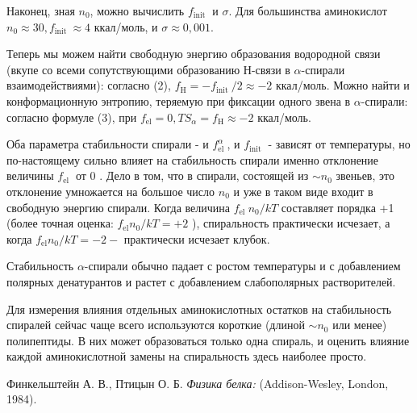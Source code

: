 \documentclass[
11pt,%
tightenlines,%
twoside,%
onecolumn,%
nofloats,%
nobibnotes,%
nofootinbib,%
superscriptaddress,%
noshowpacs,%
centertags]%
{revtex4}
\begin{document}
Наконец, зная $n_0$, можно вычислить $f_{\text {init }}$ и $\sigma$. Для большинства аминокислот $n_0 \approx 30, f_{\text {init }} \approx 4$ ккал/моль, и $\sigma \approx 0,001$.

Теперь мы можем найти свободную энергию образования водородной связи (вкупе со всеми сопутствующими образованию Н-связи в $\alpha$-спирали взаимодействиями): согласно (2), $f_{\mathrm{H}}=-f_{\text {init }} / 2 \approx-2$ ккал/моль. Можно найти и конформационную энтропию, теряемую при фиксации одного звена в $\alpha$-спирали: согласно формуле (3), при $f_{\mathrm{el}}=0, T S_\alpha=f_{\mathrm{H}} \approx-2$ ккал/моль.

Оба параметра стабильности спирали - и $f_{\text {el }}^\alpha$, и $f_{\text {init }}$ - зависят от температуры, но по-настоящему сильно влияет на стабильность спирали именно отклонение величины $f_{\text {el }}$ от 0 . Дело в том, что в спирали, состоящей из $\sim n_0$ звеньев, это отклонение умножается на большое число $n_0$ и уже в таком виде входит в свободную энергию спирали. Когда величина $f_{\text {el }} n_0 / k T$ составляет порядка +1 (более точная оценка: $f_{\mathrm{el}} n_0 / k T=+2$ ), спиральность практически исчезает, а когда $f_{\mathrm{el}} n_0 / k T=-2-$ практически исчезает клубок. 

Стабильность $\alpha$-спирали обычно падает с ростом температуры и с добавлением полярных денатурантов и растет с добавлением слабополярных растворителей.

Для измерения влияния отдельных аминокислотных остатков на стабильность спиралей сейчас чаще всего используются короткие (длиной $\sim n_0$ или менее) полипептиды. В них может образоваться только одна спираль, и оценить влияние каждой аминокислотной замены на спиральность здесь наиболее просто. 

%
%

\begin{thebibliography}{99}
Финкельштейн А. В., Птицын О. Б. \emph{Физика белка:} (Addison-Wesley, London, 1984).




\end{thebibliography}
\end{document}
